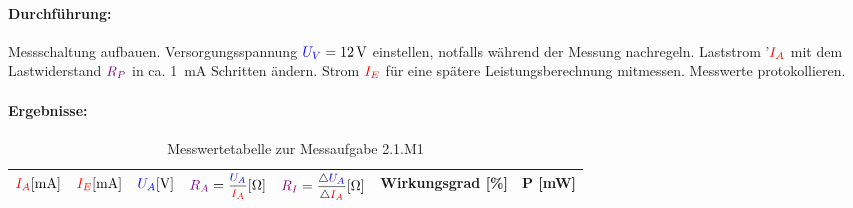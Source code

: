 \documentclass[11pt,a4paper,titlepage,parskip=half]{scrreprt}
\begin{document}
              \paragraph{Durchführung:} Messschaltung aufbauen. Versorgungsspannung $\textcolor{blue}{U_V} = \SI{12}{\volt}$ einstellen, notfalls
              während der Messung nachregeln. Laststrom '$\textcolor{red}{I_A}$ mit dem Lastwiderstand $\textcolor{violet}{R_P}$ in
              ca. \SI{1}{\milli\ampere} Schritten ändern. Strom $\textcolor{red}{I_E}$ für eine spätere Leistungsberechnung mitmessen.
              Messwerte protokollieren.

              \paragraph{Ergebnisse:}
                \begin{center}
                    \begin{table}[H]
                        \caption{Messwertetabelle zur Messaufgabe 2.1.M1}
                        \label{tbl:messergebnisse2.1}
                        \renewcommand{\arraystretch}{1.5}
                         \begin{center}
                            \begin{tabular}{c|c|c|c|c|c|c}
                                $\textcolor{red}{I_A} [\si{\milli\ampere}]$  &
                                $\textcolor{red}{I_E} [\si{\milli\ampere}]$ &
                                $\textcolor{blue}{U_A} [\si{\volt}]$ &
                                $\widerstand{R_A} = \mfrac{\spannung{U_A}}{\strom{I_A}} [\si{\ohm}]$ &
                                $\widerstand{R_I} = \mfrac{\triangle\spannung{U_A}}{\triangle\strom{I_A}} [\si{\ohm}]$ &
                                Wirkungsgrad [\%] &%
                                P [\si{\milli\watt}] %
                                \\ \hline


\end{tabular}
\end{center}
\end{table}
\end{center}
\end{document}
